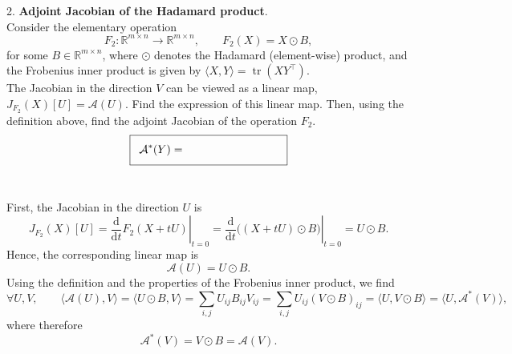 \documentclass{article}
\theoremstyle{definition}
\theoremstyle{remark}
\begin{document}
2. \textbf{Adjoint Jacobian of the Hadamard product}. \vspace{0.2cm}\\
Consider the elementary operation
\[
F_2: \mathbb{R}^{m \times n} \rightarrow \mathbb{R}^{m \times n},
\qquad
F_2(X) = X \odot B,
\]
for some $B\in \mathbb{R}^{m \times n}$, where $\odot$ denotes the Hadamard
(element-wise) product, and the Frobenius inner product is given by $\langle X, Y\rangle = \operatorname{tr}(XY^\top)$.
\vspace{0.2cm}\\
The Jacobian in the direction $V$ can be viewed as a linear map, $J_{F_2}(X)[U] = \mathcal{A}(U)$. Find the expression of this linear map. 
Then, using the definition above, find the adjoint Jacobian of the operation $F_2$.
\vspace{0.2cm}\\
\[
\setlength{\fboxsep}{8pt}
\fbox{$\displaystyle \mathcal{A}^*(Y) = \hspace{3cm}$}
\] \\
\begin{solution}
First, the Jacobian in the direction $U$ is
\[
    J_{F_2}(X)[U]
    =
    \left.\frac{\mathrm{d}}{\mathrm{d}t}
    F_2(X+tU)\right|_{t=0}
    =
    \left.\frac{\mathrm{d}}{\mathrm{d}t}
    \bigl((X+tU)\odot B\bigr)\right|_{t=0}
    =
    U\odot B.
\]
Hence, the corresponding linear map is
\[
    \mathcal{A}(U)=U\odot B.
\]
Using the definition and the properties of the Frobenius inner product, we find
\[
    \forall U, V, \qquad
    \langle \mathcal{A}(U), V \rangle
    =
    \langle U \odot B, V \rangle
    =
    \sum_{i,j} U_{ij} B_{ij} V_{ij}
    =
    \sum_{i,j} U_{ij} (V \odot B)_{ij}
    =
    \langle U, V \odot B \rangle
    =
    \langle U, \mathcal{A}^*(V) \rangle,
\]
where therefore
\[
    \mathcal{A}^*(V)=V\odot B = \mathcal{A}(V).
\]
\end{solution}
\end{document}
